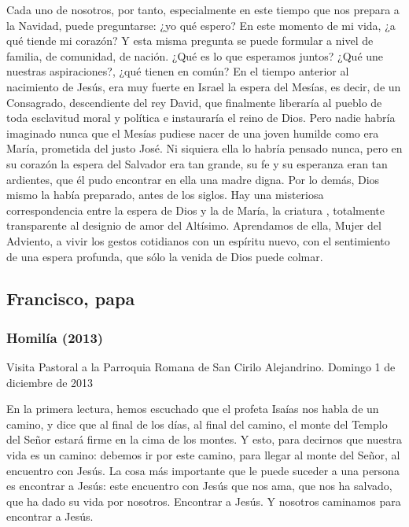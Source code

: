 {Cada uno de nosotros, por tanto, especialmente en este tiempo que nos prepara a la Navidad, puede preguntarse: ¿yo qué espero? En este momento de mi vida, ¿a qué tiende mi corazón? Y esta misma pregunta se puede formular a nivel de familia, de comunidad, de nación. ¿Qué es lo que esperamos juntos? ¿Qué une nuestras aspiraciones?, ¿qué tienen en común? En el tiempo anterior al nacimiento de Jesús, era muy fuerte en Israel la espera del Mesías, es decir, de un Consagrado, descendiente del rey David, que finalmente liberaría al pueblo de toda esclavitud moral y política e instauraría el reino de Dios. Pero nadie habría imaginado nunca que el Mesías pudiese nacer de una joven humilde como era María, prometida del justo José. Ni siquiera ella lo habría pensado nunca, pero en su corazón la espera del Salvador era tan grande, su fe y su esperanza eran tan ardientes, que él pudo encontrar en ella una madre digna. Por lo demás, Dios mismo la había preparado, antes de los siglos. Hay una misteriosa correspondencia entre la espera de Dios y la de María, la criatura , totalmente transparente al designio de amor del Altísimo. Aprendamos de ella, Mujer del Adviento, a vivir los gestos cotidianos con un espíritu nuevo, con el sentimiento de una espera profunda, que sólo la venida de Dios puede colmar.



\subsection{Francisco, papa}

\subsubsection{Homilía (2013)}
Visita Pastoral a la Parroquia Romana de San Cirilo Alejandrino. Domingo 1 de diciembre de 2013}

En la primera lectura, hemos escuchado que el profeta Isaías nos habla de un camino, y dice que al final de los días, al final del camino, el monte del Templo del Señor estará firme en la cima de los montes. Y esto, para decirnos que nuestra vida es un camino: debemos ir por este camino, para llegar al monte del Señor, al encuentro con Jesús. La cosa más importante que le puede suceder a una persona es encontrar a Jesús: este encuentro con Jesús que nos ama, que nos ha salvado, que ha dado su vida por nosotros. Encontrar a Jesús. Y nosotros caminamos para encontrar a Jesús.

